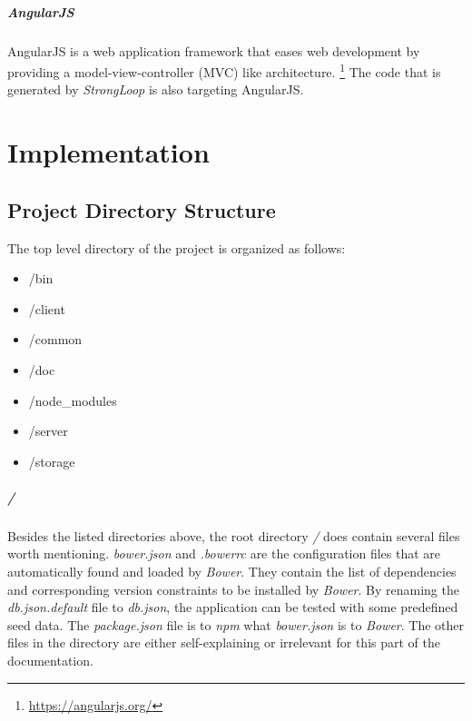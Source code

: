 \documentclass[nochapterpage,nopartpage,noheadingspace,numbersubsubsec,bigchapter,colorback,accentcolor=tud9c,10pt]{tudreport}
\begin{document}
  \paragraph{AngularJS}
    AngularJS is a web application framework that eases web development by providing a model-view-controller (MVC) like architecture.%
    \footnote{\url{https://angularjs.org/}}
    The code that is generated by \emph{StrongLoop} is also targeting AngularJS.

  \chapter{Implementation}
  \label{ch:tech:implementation}


  \section{Project Directory Structure}
  \label{sec:tech:implementation:dirs}

    The top level directory of the project is organized as follows:
        \begin{multicols}{4}
            \begin{itemize}
                \item /bin
                \item /client
                \item /common
                \item /doc
                \item /node\_modules
                \item /server
                \item /storage
            \end{itemize}
        \end{multicols}

  \paragraph{/}
    Besides the listed directories above, the root directory \emph{/} does contain several files worth mentioning. \emph{bower.json} and \emph{.bowerrc} are the configuration files that are automatically found and loaded by \emph{Bower}. They contain the list of dependencies and corresponding version constraints to be installed by \emph{Bower}. By renaming the \emph{db.json.default} file to \emph{db.json}, the application can be tested with some predefined seed data. The \emph{package.json} file is to \emph{npm} what \emph{bower.json} is to \emph{Bower}. The other files in the directory are either self-explaining or irrelevant for this part of the documentation.
\end{document}
